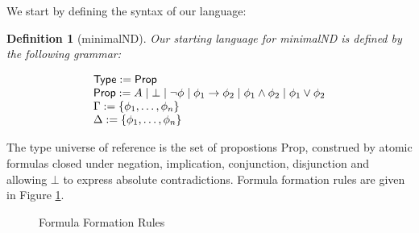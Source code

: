 \documentclass[]{article}
\newtheorem{definition}{Definition}
\begin{document}
We start by defining the syntax of our language:

\begin{definition}[{\sf minimalND}]

 Our starting language for {\sf minimalND} is defined by the following grammar:

\begin{displaymath}
\begin{array}{l}
{\sf Type}:={\sf Prop}\\
{\sf Prop}:= A \mid \bot \mid \neg \phi \mid \phi_{1} \rightarrow \phi_{2} \mid \phi_{1} \wedge \phi_{2} \mid \phi_{1} \vee \phi_{2}\\
\Gamma := \{\phi_{1}, \dots, \phi_{n}\}\\
\Delta := \{\phi_{1}, \dots, \phi_{n}\}

\end{array}
\end{displaymath}
\end{definition}

%
The type universe of reference is the set of propostions {\sf Prop}, construed by atomic formulas closed under negation, implication, conjunction, disjunction and allowing $\bot$ to express absolute contradictions. Formula formation rules are given in Figure \ref{fig:formulaconstructions}.

\begin{figure}[ht!]
\caption{Formula Formation Rules}\label{fig:formulaconstructions}
\end{figure}
\end{document}
